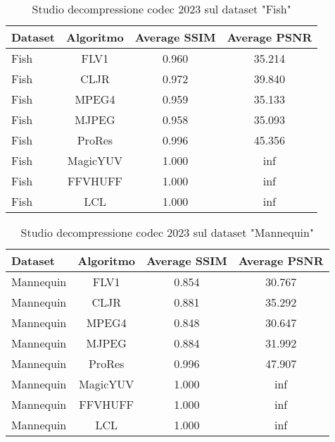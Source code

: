 \begin{table}[!ht]
\centering
\begin{tabular}{|l|c|c|c|}
\hline
Dataset               & Algoritmo & Average SSIM & Average PSNR
\\ \hline
Fish                  & FLV1      & 0.960        & 35.214       \\ \hline
Fish                  & CLJR      & 0.972        & 39.840       \\ \hline
Fish                  & MPEG4     & 0.959        & 35.133       \\ \hline
Fish                  & MJPEG     & 0.958        & 35.093       \\ \hline
Fish                  & ProRes    & 0.996        & 45.356       \\ \hline
Fish                  & MagicYUV  & 1.000        & inf          \\ \hline
Fish                  & FFVHUFF   & 1.000        & inf          \\ \hline
Fish                  & LCL       & 1.000        & inf          \\ \hline
\end{tabular}
\caption{Studio decompressione codec 2023 sul dataset  "Fish"}
\end{table}

\begin{table}[!ht]
\centering
\begin{tabular}{|l|c|c|c|}
\hline
Dataset               & Algoritmo & Average SSIM & Average PSNR
\\ \hline
Mannequin             & FLV1      & 0.854        & 30.767       \\ \hline
Mannequin             & CLJR      & 0.881        & 35.292       \\ \hline
Mannequin             & MPEG4     & 0.848        & 30.647       \\ \hline
Mannequin             & MJPEG     & 0.884        & 31.992       \\ \hline
Mannequin             & ProRes    & 0.996        & 47.907       \\ \hline
Mannequin             & MagicYUV  & 1.000        & inf          \\ \hline
Mannequin             & FFVHUFF   & 1.000        & inf          \\ \hline
Mannequin             & LCL       & 1.000        & inf          \\ \hline
\end{tabular}
\caption{Studio decompressione codec 2023 sul dataset  "Mannequin"}
\end{table}

